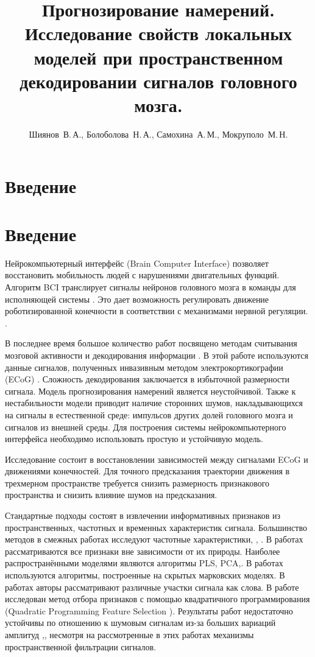\documentclass[12pt,twoside]{article}
\title
    [Прогнозирование намерений]
    {Прогнозирование намерений. Исследование свойств локальных моделей при пространственном декодировании сигналов головного мозга.}
\author
    [Болоболова~Н.\,А.]
    {Шиянов~В.\,А., Болоболова~Н.\,А., Самохина~А.\,М., Мокруполо~М.\,Н.}
\begin{document}
\maketitle
\bigskip
\bigskip
\bigskip
\bigskip
\bigskip
\maketitleSecondary

\section{Введение}
\section{Введение}
Нейрокомпьютерный интерфейс (Brain Computer Interface) \cite{Morishita2014} позволяет восстановить мобильность людей с нарушениями двигательных функций.  Алгоритм BCI транслирует сигналы нейронов головного мозга в команды для исполняющей системы \cite{Morishita2014}. Это дает возможность регулировать движение роботизированной конечности в соответствии с механизмами нервной регуляции. \cite{Donoghue2008}. 


В последнее время большое количество работ посвящено методам считывания мозговой активности и декодирования информации \cite{Hu2018}\cite{Song2017}\cite{Loza2017}\cite{Eliseyev2016}\cite{Gaglianese2016}\cite{Bundy2016}\cite{Morishita2014}.
В этой работе используются данные сигналов, полученных инвазивным методом электрокортикографии (ECoG) \cite{Sirven2014}. Сложность декодирования заключается в избыточной размерности сигнала. Модель прогнозирования намерений является неустойчивой. Также к нестабильности модели приводит наличие сторонних шумов, накладывающихся на сигналы в естественной среде: импульсов других долей головного мозга и сигналов из внешней среды.  Для построения системы нейрокомпьютерного интерфейса необходимо использовать простую и устойчивую модель. 


Исследование состоит в восстановлении зависимостей между сигналами ECoG и движениями конечностей. Для точного предсказания траектории движения в трехмерном пространстве требуется снизить размерность признакового пространства и снизить влияние шумов на предсказания.


Стандартные подходы состоят в извлечении информативных признаков из пространственных, частотных и временных характеристик сигнала\cite{Morishita2014}\cite{Alexander2013}. Большинство методов в смежных работах исследуют частотные характеристики\cite{Chin2007}, \cite{Eliseyev2014}, \cite{Loza2017}. В работах \cite{Eliseyev2016}\cite{Motrenko2018} рассматриваются все признаки вне зависимости от их природы. Наиболее распространёнными моделями являются алгоритмы PLS\cite{Rosipal2006}\cite{Eliseyev2016}, PCA\cite{Zhao2010},\cite{Song2017}. В работах \cite{Zhao2014} используются алгоритмы, построенные на скрытых марковских моделях. В  работах \cite{Loza2017}\cite{Song2017} авторы рассматривают различные участки сигнала как слова. В работе \cite{Motrenko2018} исследован метод отбора признаков с помощью квадратичного программирования (Quadratic Programming Feature Selection \cite{rodriguez2010quadratic}). Результаты работ недостаточно устойчивы по отношению к шумовым сигналам из-за больших вариаций амплитуд \cite{Eliseyev2014},\cite{Song2017}, несмотря на рассмотренные в этих работах механизмы пространственной фильтрации сигналов.
\end{document}
